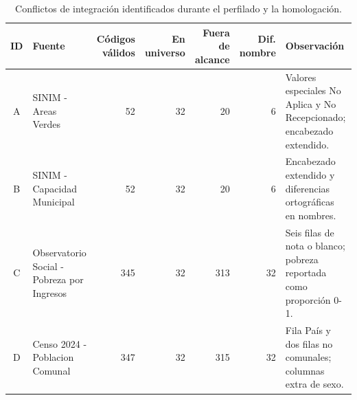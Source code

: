 \begin{table}[htbp]
\centering
\footnotesize
\caption{Conflictos de integración identificados durante el perfilado y la homologación.}
\begin{tabular}{|c|p{3.3cm}|r|r|r|r|p{4.2cm}|}
\hline
ID & Fuente & Códigos válidos & En universo & Fuera de alcance & Dif. nombre & Observación \\
\hline
A & SINIM - Areas Verdes & 52 & 32 & 20 & 6 & Valores especiales No Aplica y No Recepcionado; encabezado extendido. \\
B & SINIM - Capacidad Municipal & 52 & 32 & 20 & 6 & Encabezado extendido y diferencias ortográficas en nombres. \\
C & Observatorio Social - Pobreza por Ingresos & 345 & 32 & 313 & 32 & Seis filas de nota o blanco; pobreza reportada como proporción 0-1. \\
D & Censo 2024 - Poblacion Comunal & 347 & 32 & 315 & 32 & Fila País y dos filas no comunales; columnas extra de sexo. \\
\hline
\end{tabular}
\end{table}
